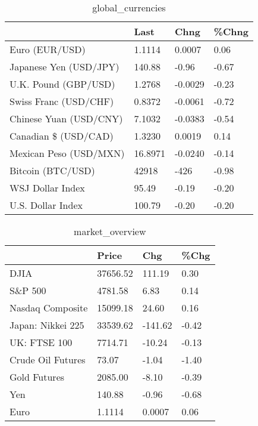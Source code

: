 \documentclass{article}%
\begin{document}
%


\begin{table}[htbp]%
\caption{global\_currencies}%
\centering%
\begin{adjustbox}{width=1\textwidth}%
\begin{tabular}{llll}
\toprule
                       &    Last &    Chng & \%Chng \\
\midrule
        Euro (EUR/USD) &  1.1114 &  0.0007 &  0.06 \\
Japanese Yen (USD/JPY) &  140.88 &   -0.96 & -0.67 \\
  U.K. Pound (GBP/USD) &  1.2768 & -0.0029 & -0.23 \\
 Swiss Franc (USD/CHF) &  0.8372 & -0.0061 & -0.72 \\
Chinese Yuan (USD/CNY) &  7.1032 & -0.0383 & -0.54 \\
  Canadian \$ (USD/CAD) &  1.3230 &  0.0019 &  0.14 \\
Mexican Peso (USD/MXN) & 16.8971 & -0.0240 & -0.14 \\
     Bitcoin (BTC/USD) &   42918 &    -426 & -0.98 \\
      WSJ Dollar Index &   95.49 &   -0.19 & -0.20 \\
     U.S. Dollar Index &  100.79 &   -0.20 & -0.20 \\
\bottomrule
\end{tabular}
%
\end{adjustbox}%
\end{table}

%


\begin{table}[htbp]%
\caption{market\_overview}%
\centering%
\begin{adjustbox}{width=1\textwidth}%
\begin{tabular}{llll}
\toprule
                  &    Price &     Chg &  \%Chg \\
\midrule
             DJIA & 37656.52 &  111.19 &  0.30 \\
          S\&P 500 &  4781.58 &    6.83 &  0.14 \\
 Nasdaq Composite & 15099.18 &   24.60 &  0.16 \\
Japan: Nikkei 225 & 33539.62 & -141.62 & -0.42 \\
     UK: FTSE 100 &  7714.71 &  -10.24 & -0.13 \\
Crude Oil Futures &    73.07 &   -1.04 & -1.40 \\
     Gold Futures &  2085.00 &   -8.10 & -0.39 \\
              Yen &   140.88 &   -0.96 & -0.68 \\
             Euro &   1.1114 &  0.0007 &  0.06 \\
\bottomrule
\end{tabular}
%
\end{adjustbox}%
\end{table}

%
\end{document}
